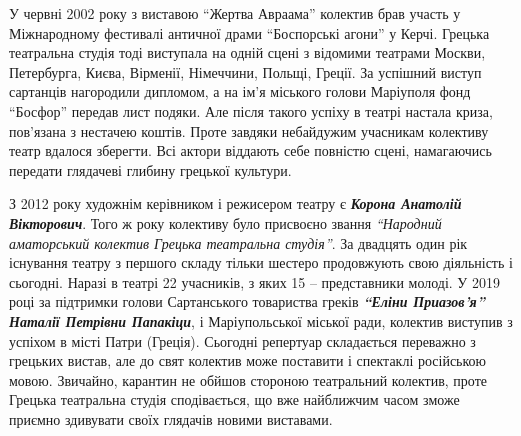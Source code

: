 У червні 2002 року з виставою \enquote{Жертва Авраама} колектив брав участь у
Міжнародному фестивалі античної драми \enquote{Боспорські агони} у Керчі. Грецька
театральна студія тоді виступала на одній сцені з відомими театрами Москви,
Петербурга, Києва, Вірменії, Німеччини, Польщі, Греції. За успішний виступ
сартанців нагородили дипломом, а на ім'я міського голови Маріуполя фонд
\enquote{Босфор} передав лист подяки. Але після такого успіху в театрі настала криза,
пов'язана з нестачею коштів. Проте завдяки небайдужим учасникам колективу театр
вдалося зберегти. Всі актори віддають себе повністю сцені, намагаючись передати
глядачеві глибину грецької культури.


З 2012 року художнім керівником і режисером театру є \emph{\textbf{Корона Анатолій
Вікторович}}. Того ж року колективу було присвоєно звання \emph{\enquote{Народний аматорський
колектив Грецька театральна студія}}. За двадцять один  рік існування театру з
першого складу тільки шестеро продовжують свою діяльність і сьогодні. Наразі в
театрі 22 учасників, з яких 15 – представники молоді. У 2019 році за підтримки
голови Сартанського товариства греків \textbf{\emph{\enquote{Еліни Приазов'я} Наталії Петрівни
Папакіци}}, і Маріупольської міської ради, колектив виступив з успіхом в місті
Патри (Греція). Сьогодні репертуар складається переважно з грецьких вистав, але
до свят колектив може поставити і спектаклі російською мовою. Звичайно,
карантин не обйшов стороною театральний колектив, проте Грецька театральна
студія сподівається, що вже найближчим часом зможе приємно здивувати своїх
глядачів новими виставами. 
